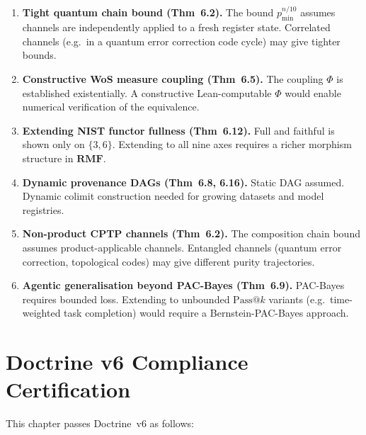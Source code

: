 \begin{enumerate}
  \item \textbf{Tight quantum chain bound (Thm~6.2).}
        The bound $p_{\min}^{n/10}$ assumes channels are independently
        applied to a fresh register state.  Correlated channels (e.g.\
        in a quantum error correction code cycle) may give tighter bounds.

  \item \textbf{Constructive WoS measure coupling (Thm~6.5).}
        The coupling $\Phi$ is established existentially.  A
        constructive Lean-computable $\Phi$ would enable numerical
        verification of the equivalence.

  \item \textbf{Extending NIST functor fullness (Thm~6.12).}
        Full and faithful is shown only on $\{3,6\}$.  Extending to
        all nine axes requires a richer morphism structure in
        $\mathbf{RMF}$.

  \item \textbf{Dynamic provenance DAGs (Thm~6.8, 6.16).}
        Static DAG assumed.  Dynamic colimit construction needed for
        growing datasets and model registries.

  \item \textbf{Non-product CPTP channels (Thm~6.2).}
        The composition chain bound assumes product-applicable channels.
        Entangled channels (quantum error correction, topological
        codes) may give different purity trajectories.

  \item \textbf{Agentic generalisation beyond PAC-Bayes (Thm~6.9).}
        PAC-Bayes requires bounded loss.  Extending to unbounded
        $\mathrm{Pass}@k$ variants (e.g.\ time-weighted task
        completion) would require a Bernstein-PAC-Bayes approach.
\end{enumerate}

\section{Doctrine v6 Compliance Certification}
\label{sec:doctrine-compliance}

\noindent
This chapter passes Doctrine~v6 as follows:

